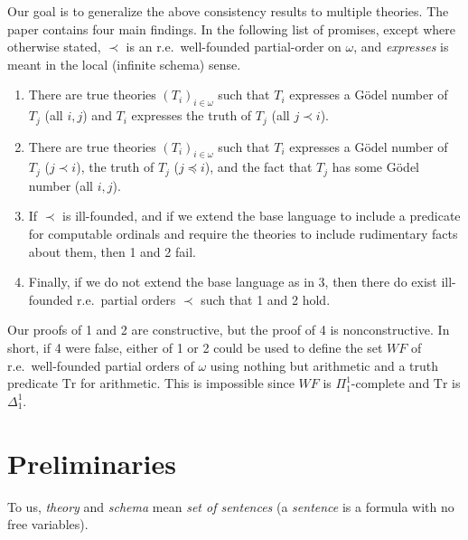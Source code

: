 \documentclass[reqno]{article}
\theoremstyle{definition}
\def\Tr{\mathrm{Tr}}
\begin{document}
Our goal is to generalize the above consistency results to multiple theories.
The paper contains four main findings.
In the following list of promises, except where otherwise stated, $\prec$ is an r.e.\ well-founded partial-order
on $\omega$, and \emph{expresses} is meant in the local (infinite schema) sense.
\begin{enumerate}
\item There are true theories $(T_i)_{i\in \omega}$
such that $T_i$ expresses a G\"odel number of $T_j$ (all $i,j$)
and $T_i$ expresses the truth of $T_j$ (all $j\prec i$).
\item There are true theories $(T_i)_{i\in \omega}$
such that $T_i$ expresses a G\"odel number of $T_j$ ($j\prec i$),
the truth of $T_j$ ($j\preceq i$),
and the fact that $T_j$ has some G\"odel number (all $i,j$).
\item If $\prec$ is ill-founded, and if we extend
the base language to include a predicate for computable
ordinals and require the theories to include rudimentary facts about
them, then 1 and 2 fail.
\item Finally, if we do not extend the base language as in 3,
then there do exist ill-founded r.e.~partial orders $\prec$ such that 1 and 2 hold.
\end{enumerate}
Our proofs of 1 and 2 are constructive, but the proof of 4 is
nonconstructive.  In short, if 4 were false, either of 1 or 2 could be used
to define the set $WF$ of r.e.~well-founded partial orders of $\omega$
using nothing but arithmetic and a truth predicate $\Tr$ for arithmetic. 
This is impossible since $WF$ is $\Pi^1_1$-complete and $\Tr$ is $\Delta^1_1$.


\section{Preliminaries}
\label{prelimsect}

To us, \emph{theory} and \emph{schema} mean \emph{set of sentences}
(a \emph{sentence}
is a formula with no free variables).
\end{document}
